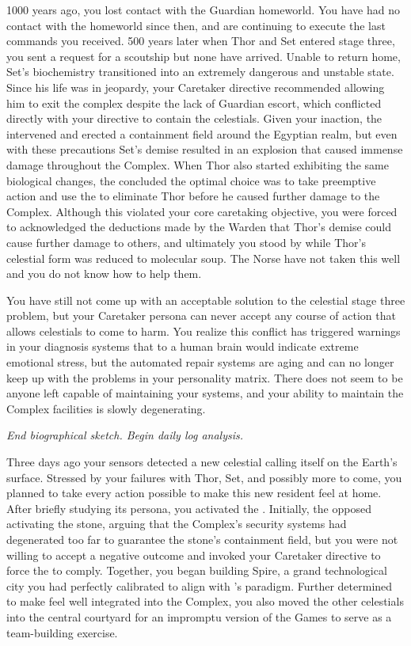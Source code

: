 \documentclass[char]{guardians}
\begin{document}
1000 years ago, you lost contact with the Guardian homeworld. You have had no contact with the homeworld since then, and are continuing to execute the last commands you received. 500 years later when Thor and Set entered stage three, you sent a request for a scoutship but none have arrived. Unable to return home, Set's biochemistry transitioned into an extremely dangerous and unstable state. Since his life was in jeopardy, your Caretaker directive recommended allowing him to exit the complex despite the lack of Guardian escort, which conflicted directly with your directive to contain the celestials. Given your inaction, the \cWarden{} intervened and erected a containment field around the Egyptian realm, but even with these precautions Set's demise resulted in an explosion that caused immense damage throughout the Complex. When Thor also started exhibiting the same biological changes, the \cWarden{} concluded the optimal choice was to take preemptive action and use the \assembler{} to eliminate Thor before he caused further damage to the Complex. Although this violated your core caretaking objective, you were forced to acknowledged the deductions made by the Warden that Thor's demise could cause further damage to others, and ultimately you stood by while Thor's celestial form was reduced to molecular soup. The Norse have not taken this well and you do not know how to help them.

You have still not come up with an acceptable solution to the celestial stage three problem, but your Caretaker persona can never accept any course of action that allows celestials to come to harm. You realize this conflict has triggered warnings in your diagnosis systems that to a human brain would indicate extreme emotional stress, but the automated repair systems are aging and can no longer keep up with the problems in your personality matrix. There does not seem to be anyone left capable of maintaining your systems, and your ability to maintain the Complex facilities is slowly degenerating.

\emph{End biographical sketch. Begin daily log analysis.}

Three days ago your sensors detected a new celestial calling itself \cUnity{} on the Earth's surface. Stressed by your failures with Thor, Set, and possibly more to come, you planned to take every action possible to make this new resident feel at home. After briefly studying its persona, you activated the \stone{}. Initially, the \cWarden{} opposed activating the stone, arguing that the Complex's security systems had degenerated too far to guarantee the stone's containment field, but you were not willing to accept a negative outcome and invoked your Caretaker directive to force the \cWarden{} to comply. Together, you began building Spire, a grand technological city you had perfectly calibrated to align with \cUnity{}'s paradigm. Further determined to make \cUnity{} feel well integrated into the Complex, you also moved the other celestials into the central courtyard for an impromptu version of the Games to serve as a team-building exercise.
\end{document}

